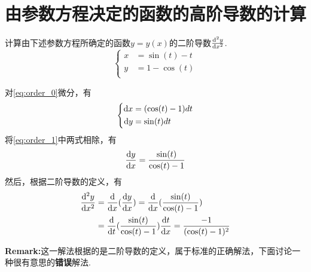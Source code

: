 
\newcommand{\sod}{\frac{\dif^2y}{\dif x ^2}}
\newcommand{\rmk}{\textbf{Remark:}}


\section{由参数方程决定的函数的高阶导数的计算}


\begin{example}
\label{eg:function_induced_by_parafunctions}
	计算由下述参数方程所确定的函数$y=y(x)$的二阶导数$\sod$.
		\begin{equation}
		\label{eq:order_0}
		 	\left\{
				\begin{aligned}
				x & = \sin(t) - t \\
				y & = 1 - \cos(t) \\
				\end{aligned}
			\right.
		\end{equation}

\end{example}

\begin{solution}
	对\eqref{eq:order_0}微分，有
	\begin{equation}
		\label{eq:order_1}
		 	\left\{
				\begin{aligned}
				\mathrm{d} x & = (\cos(t) - 1) dt \\
				\mathrm{d} y & = \sin(t) dt \\
				\end{aligned}
			\right.
		\end{equation}
	将\eqref{eq:order_1}中两式相除，有
	\begin{equation}
		\label{eq:fod}
		 	\frac{\mathrm{d} y}{\mathrm{d} x} = \frac{\sin(t)}{\cos(t)-1}
		\end{equation}
	然后，根据二阶导数的定义，有
		\begin{equation}
		\label{eq:true_sod}
		\begin{aligned}
			\sod &= \frac{\dif}{\dif x}(\frac{\dif y}{\dif x}) = \frac{\dif}{\dif x}(\frac{\sin(t)}{\cos(t)-1})  \\
					 &= \frac{\dif}{\dif t}(\frac{\sin(t)}{\cos(t)-1}) \frac{\dif t}{\dif x} = \frac{-1}{(\cos(t)-1)^2}
		\end{aligned}
		\end{equation}
\end{solution}

	\rmk 这一解法根据的是二阶导数的定义，属于标准的正确解法，下面讨论一种很有意思的\textbf{错误}解法.\par

